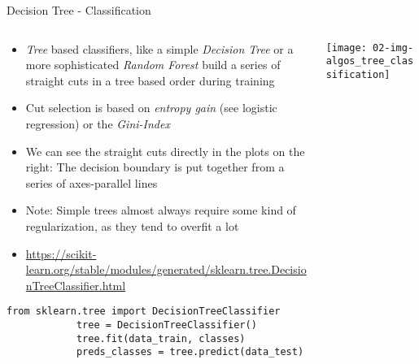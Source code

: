   \begin{frame}[fragile]{Decision Tree - Classification}
    \begin{columns}
      \begin{column}{0.65\textwidth}
        \begin{itemize}
          \item \emph{Tree} based classifiers, like a simple \emph{Decision Tree} or a more sophisticated \emph{Random Forest} build a series of straight cuts in a tree based order during training
          \item Cut selection is based on \emph{entropy gain} (see logistic regression) or the \emph{Gini-Index}
          \item We can see the straight cuts directly in the plots on the right: The decision boundary is put together from a series of axes-parallel lines
          \item Note: Simple trees almost always require some kind of regularization, as they tend to overfit a lot
          \item \small\url{https://scikit-learn.org/stable/modules/generated/sklearn.tree.DecisionTreeClassifier.html}
        \end{itemize}
        \vspace{-0.5em}
        \begin{mdframed}
          \begin{lstlisting}[style=dark, gobble=10, title=\lsttitlelight{Decision Tree classification [Note: example shortened]}]
            from sklearn.tree import DecisionTreeClassifier
            tree = DecisionTreeClassifier()
            tree.fit(data_train, classes)
            preds_classes = tree.predict(data_test)
          \end{lstlisting}
        \end{mdframed}
      \end{column}
      \begin{column}{0.35\textwidth}
        \vspace{1em}

        \texttt{[image: 02-img-algos\_tree\_classification]}
      \end{column}
    \end{columns}
  \end{frame}

